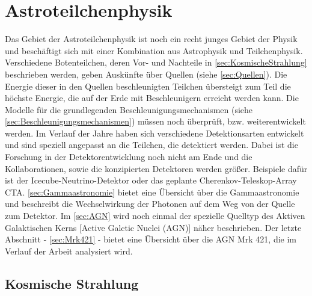 \chapter{Astroteilchenphysik}
\label{chapter:Astroteilchenphysik}
Das Gebiet der Astroteilchenphysik ist noch ein recht junges Gebiet der Physik und beschäftigt sich mit einer Kombination aus Astrophysik und Teilchenphysik.
Verschiedene Botenteilchen, deren Vor- und Nachteile in \autoref{sec:KosmischeStrahlung} beschrieben werden, geben Auskünfte über Quellen (siehe \autoref{sec:Quellen}).
Die Energie dieser in den Quellen beschleunigten Teilchen übersteigt zum Teil die höchste Energie, die auf der Erde mit Beschleunigern erreicht werden kann.
Die Modelle für die grundlegenden Beschleunigungsmechanismen (siehe \autoref{sec:Beschleunigungsmechanismen}) müssen noch überprüft, bzw. weiterentwickelt werden.
Im Verlauf der Jahre haben sich verschiedene Detektionsarten entwickelt und sind speziell angepasst an die Teilchen, die detektiert werden.
Dabei ist die Forschung in der Detektorentwicklung noch nicht am Ende und die Kollaborationen, sowie die konzipierten Detektoren werden größer.
Beispiele dafür ist der Icecube-Neutrino-Detektor oder das geplante Cherenkov-Teleskop-Array CTA.
\autoref{sec:Gammaastronomie} bietet eine Übersicht über die Gammaastronomie und beschreibt die Wechselwirkung der Photonen auf dem Weg von der Quelle zum Detektor. 
Im \autoref{sec:AGN} wird noch einmal der spezielle Quelltyp des Aktiven Galaktischen Kerns [Active Galctic Nuclei (AGN)] näher beschrieben.
Der letzte Abschnitt - \autoref{sec:Mrk421} - bietet eine Übersicht über die AGN Mrk 421, die im Verlauf der Arbeit analysiert wird.

\section{Kosmische Strahlung}
\label{sec:KosmischeStrahlung}

